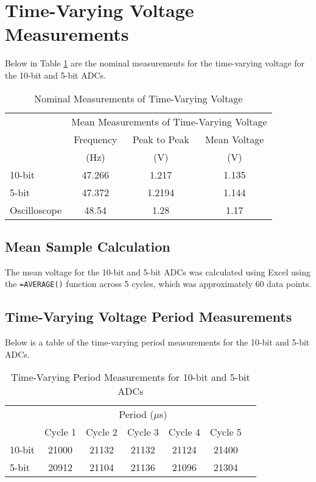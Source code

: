 \section{Time-Varying Voltage Measurements}
\label{sec:appendix-time-varying-voltage-measurements}

\noindent Below in Table \ref{tab:time-varying-voltage-mean-measurements} are the nominal measurements for the time-varying voltage for the 10-bit and 5-bit ADCs.
\begin{table}[h]
    \centering
    \caption{Nominal Measurements of Time-Varying Voltage}
    \label{tab:time-varying-voltage-mean-measurements}
    \begin{tabular}{lccc}
      \toprule
           & \multicolumn{3}{c}{Mean Measurements of Time-Varying Voltage} \\
    \cmidrule{2-4}
           & Frequency & Peak to Peak & Mean Voltage       \\
           & (Hz)      & (V)          & (V)           \\
    \midrule
    10-bit & 47.266  & 1.217        & 1.135         \\
    5-bit  & 47.372  & 1.2194       & 1.144         \\
    Oscilloscope & 48.54 & 1.28 & 1.17 \\
   \bottomrule
    \end{tabular}
\end{table}
\subsection{Mean Sample Calculation}
\noindent The mean voltage for the 10-bit and 5-bit ADCs was calculated using Excel using the \texttt{=AVERAGE()} function across 5 cycles, which was
approximately 60 data points. 

\subsection{Time-Varying Voltage Period Measurements}

\noindent Below is a table of the time-varying period measurements for the 10-bit and 5-bit ADCs. 
\begin{table}[h]
    \centering
    \caption{Time-Varying Period Measurements for 10-bit and 5-bit ADCs}
    \begin{tabular}{lcccccc}
    \toprule
       & \multicolumn{5}{c}{Period ($\mu$s)}    \\
    \cmidrule{2-6}
       & Cycle 1    & Cycle 2   & Cycle 3   & Cycle 4   & Cycle 5    \\
    \midrule
    10-bit & 21000 & 21132 & 21132 & 21124 & 21400  \\
    5-bit  & 20912 & 21104 & 21136 & 21096 & 21304  \\
    \bottomrule
    \end{tabular}
\end{table}

